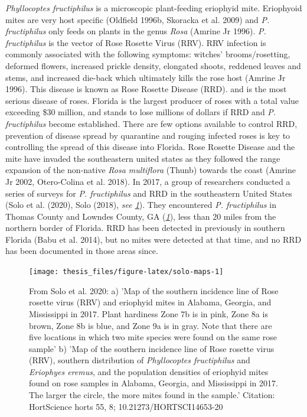 \documentclass[12pt,final,CPage]{ufthesis}
\begin{document}
{  \emph{Phyllocoptes fructiphilus} is a microscopic plant-feeding eriophyid mite. Eriophyoid mites are very host specific (Oldfield 1996b, Skoracka et al. 2009) and \emph{P. fructiphilus} only feeds on plants in the genus \emph{Rosa} (Amrine Jr 1996). \emph{P. fructiphilus} is the vector of Rose Rosette Virus (RRV). RRV infection is commonly associated with the following symptoms: witches' brooms/rosetting, deformed flowers, increased prickle density, elongated shoots, reddened leaves and stems, and increased die-back which ultimately kills the rose host (Amrine Jr 1996). This disease is known as Rose Rosette Disease (RRD). and is the most serious disease of roses. Florida is the largest producer of roses with a total value exceeding \$30 million, and stands to lose millions of dollars if RRD and \emph{P. fructiphilus} become established. There are few options available to control RRD, prevention of disease spread by quarantine and rouging infected roses is key to controlling the spread of this disease into Florida. Rose Rosette Disease and the mite have invaded the southeastern united states as they followed the range expansion of the non-native \emph{Rosa multiflora} (Thunb) towards the coast (Amrine Jr 2002, Otero-Colina et al. 2018). In 2017, a group of researchers conducted a series of surveys for \emph{P. fructiphilus} and RRD in the southeastern United States (Solo et al. (2020), Solo (2018), \emph{see \ref{fig:solo-maps}}). They encountered \emph{P. fructiphilus} in Thomas County and Lowndes County, GA (\emph{\ref{fig:solo-maps}}), less than 20 miles from the northern border of Florida. RRD has been detected in previously in southern Florida (Babu et al. 2014), but no mites were detected at that time, and no RRD has been documented in those areas since.
  \begin{figure}

  {\centering \texttt{[image: thesis\_files/figure-latex/solo-maps-1]} 

  }

  \caption{From Solo et al. 2020: a) 'Map of the southern incidence line of Rose rosette virus (RRV) and eriophyid mites in Alabama, Georgia, and Mississippi in 2017. Plant hardiness Zone 7b is in pink, Zone 8a is brown, Zone 8b is blue, and Zone 9a is in gray. Note that there are five locations in which two mite species were found on the same rose sample' b) 'Map of the southern incidence line of Rose rosette virus (RRV), southern distribution of \textit{Phyllocoptes fructiphilus} and \textit{Eriophyes eremus}, and the population densities of eriophyid mites found on rose samples in Alabama, Georgia, and Mississippi in 2017. The larger the circle, the more mites found in the sample.' Citation: HortScience horts 55, 8; 10.21273/HORTSCI14653-20}\label{fig:solo-maps}
  \end{figure}
  \hypertarget{intro-survey}{%
}}
\end{document}
